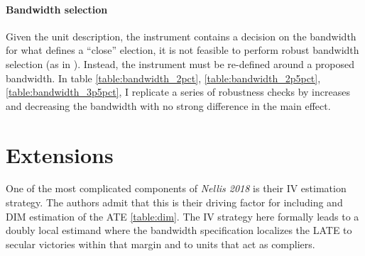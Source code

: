 \documentclass{scrartcl}
\begin{document}
\paragraph{Bandwidth selection}
Given the unit description, the instrument contains a decision on the bandwidth for what defines a ``close'' election,
it is not feasible to perform robust bandwidth selection (as in \cite{Cattaneo_2019}).
Instead, the instrument must be re-defined around a proposed bandwidth.
In table \ref{table:bandwidth_2pct}, \ref{table:bandwidth_2p5pct}, \ref{table:bandwidth_3p5pct}, I replicate a series of robustness checks by increases and decreasing the bandwidth with no strong difference in the main effect. 







\section{Extensions} \label{extensions}

One of the most complicated components of \textit{Nellis 2018} is their IV estimation strategy.
The authors admit that this is their driving factor for including and DIM estimation of the ATE \ref{table:dim}.
The IV strategy here formally leads to a doubly local estimand where the bandwidth specification localizes the LATE to secular victories within that margin and to units that act as compliers.
\end{document}
